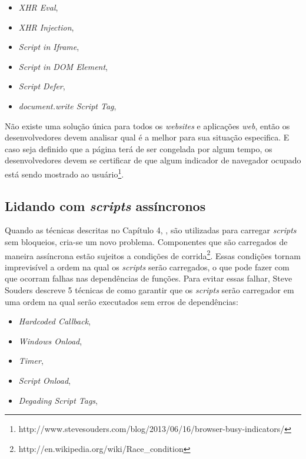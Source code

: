 \begin{itemize}
	\item \textit{XHR Eval}, \cite[p.~29]{EvenFaster}
	\item \textit{XHR Injection}, \cite[p.~31]{EvenFaster}
	\item \textit{Script in Iframe}, \cite[p.~31]{EvenFaster}
	\item \textit{Script in DOM Element}, \cite[p.~32]{EvenFaster}
	\item \textit{Script Defer}, \cite[p.~32]{EvenFaster}
	\item \textit{document.write Script Tag}, \cite[p.~33]{EvenFaster}
\end{itemize}

Não existe uma solução única para todos os \textit{websites} e aplicações \textit{web}, então os desenvolvedores devem analisar qual é a melhor para sua situação especifica. E caso seja definido que a página terá de ser congelada por algum tempo, os desenvolvedores devem se certificar de que algum indicador de navegador ocupado está sendo mostrado ao usuário\footnote{http://www.stevesouders.com/blog/2013/06/16/browser-busy-indicators/}.

\subsection{Lidando com \textit{scripts} assíncronos}
\label{subsec:evenfaster_cap5}
Quando as técnicas descritas no Capítulo 4, \cite[p.~27]{EvenFaster}, são utilizadas para carregar \textit{scripts} sem bloqueios, cria-se um novo problema. Componentes que são carregados de maneira assíncrona estão sujeitos a condições de corrida\footnote{http://en.wikipedia.org/wiki/Race\_condition}. Essas condições tornam imprevisível a ordem na qual os \textit{scripts} serão carregados, o que pode fazer com que ocorram falhas nas dependências de funções. Para evitar essas falhar, Steve Souders descreve 5 técnicas de como garantir que os \textit{scripts} serão carregador em uma ordem na qual serão executados sem erros de dependências:

\begin{itemize}
	\item \textit{Hardcoded Callback}, \cite[p.~46]{EvenFaster}
	\item \textit{Windows Onload}, \cite[p.~47]{EvenFaster}
	\item \textit{Timer}, \cite[p.~48]{EvenFaster}
	\item \textit{Script Onload}, \cite[p.~49]{EvenFaster}
	\item \textit{Degading Script Tags}, \cite[p.~50]{EvenFaster}
\end{itemize}

